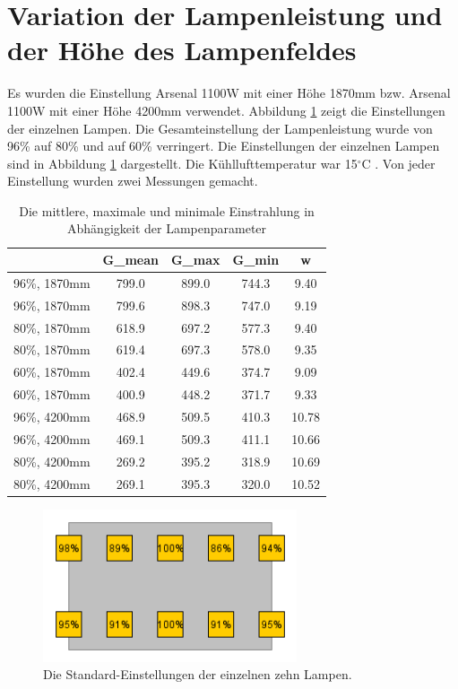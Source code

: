 \documentclass[a4paper,bibtotoc,oneside]{scrbook}
\begin{document}
\FloatBarrier

\section{Variation der Lampenleistung und der Höhe des Lampenfeldes}

Es wurden die Einstellung Arsenal 1100W mit einer Höhe 1870mm bzw. Arsenal 1100W mit einer Höhe 4200mm verwendet. Abbildung \ref{std} zeigt die Einstellungen der einzelnen Lampen. Die Gesamteinstellung der Lampenleistung wurde von 96\% auf 80\% und auf 60\% verringert. Die Einstellungen der einzelnen Lampen sind in Abbildung \ref{std} dargestellt. Die Kühllufttemperatur war 15$^{\circ}$C . Von jeder Einstellung wurden zwei Messungen gemacht.

\begin{table}[htbp]
\centering
\begin{tabular}{ | c | c | c | c | c | }\hline
{\bf} & {\bf G\_{mean}} & {\bf G\_{max}} & {\bf G\_{min}} & {\bf w}\\ \hline
\hline
96\%, 1870mm & 799.0 & 899.0 & 744.3 & 9.40\\ \hline
96\%, 1870mm & 799.6 & 898.3 & 747.0 & 9.19\\ \hline
80\%, 1870mm & 618.9 & 697.2 & 577.3 & 9.40\\ \hline
80\%, 1870mm & 619.4 & 697.3 & 578.0 & 9.35\\ \hline
60\%, 1870mm & 402.4 & 449.6 & 374.7 & 9.09\\ \hline
60\%, 1870mm & 400.9 & 448.2 & 371.7 & 9.33\\ \hline
96\%, 4200mm & 468.9 & 509.5 & 410.3 & 10.78\\ \hline
96\%, 4200mm & 469.1 & 509.3 & 411.1 & 10.66\\ \hline
80\%, 4200mm & 269.2 & 395.2 & 318.9 & 10.69\\ \hline
80\%, 4200mm & 269.1 & 395.3 & 320.0 & 10.52\\ \hline
\end{tabular}
\caption{Die mittlere, maximale und minimale Einstrahlung in Abhängigkeit der Lampenparameter}\label{TabG}
\end{table}

\begin{figure}[htbp]
\centering
\includegraphics[width=75mm]{img/std.png}
\caption{Die Standard-Einstellungen der einzelnen zehn Lampen.}\label{std}
\end{figure}
\end{document}
